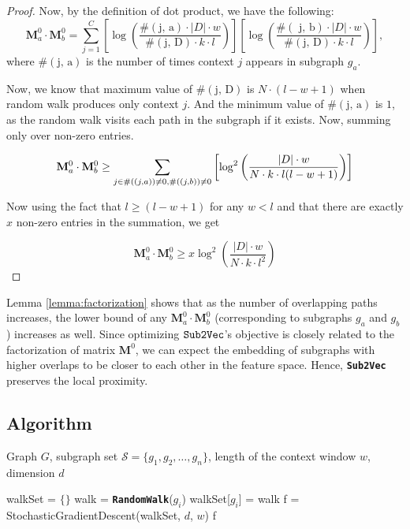 \documentclass[sigconf]{acmart}
\newcommand{\alg}{{\bf {\tt Sub2Vec}}\xspace}
\newcommand{\randomwalk}{{\bf {\tt RandomWalk}}\xspace}
\newcommand{\s}{\mathcal{S}}
\newcommand{\M}{\mathbf{M}}
\begin{document}
\begin{proof}
Now, by the definition of dot product, we have the following:
\begin{equation}
\M^{0}_{a} \cdot \M^{0}_{b} = \sum_{j=1}^C \left[ \log \left(\frac{\#(\text{j, a})\cdot |D|\cdot w} {\#(\text{j, D}) \cdot k \cdot l} \right) \right] \left[ \log \left(\frac{\#(\text{ j, b})\cdot |D|\cdot w} {\#(\text{j, D}) \cdot k \cdot l} \right) \right],
\end{equation}
where $\#(\text{j, a})$ is the number of times context $j$ appears in subgraph $g_a$.

Now, we know that maximum value of $\#(\text{j, D})$ is ${N \cdot (l - w + 1 )}$ when random walk produces only context $j$. And the minimum value of $\#(\text{j, a})$ is $1$, as the random walk visits each path in the subgraph if it exists. Now, summing only over non-zero entries.

\begin{equation}
\M^{0}_{a} \cdot \M^{0}_{b} \geq \sum_{j \in {\#(\text(j,a)) \neq 0 , \#(\text(j,b)) \neq 0}} \left[ \log^2 \left(\frac{|D|\cdot w} { N \cdot k \cdot l (l-w+1)} \right) \right]
\end{equation}

Now using the fact that $l \geq (l -w +1)$ for any $w < l$ and that there are exactly $x$ non-zero entries in the summation, we get

\begin{equation}
\M^{0}_{a} \cdot \M^{0}_{b} \geq x  \log ^2 \left(\frac{|D|\cdot w} { N \cdot k \cdot l^2} \right)
\end{equation}
\end{proof}

Lemma \ref{lemma:factorization} shows that as the number of overlapping paths increases, the lower bound of any $\M^{0}_{a} \cdot \M^{0}_{b}$ (corresponding to subgraphs $g_a$ and $g_b$) increases as well. Since optimizing $\alg$'s objective is closely related to the factorization of matrix $\M^0$, we can expect the embedding of subgraphs with higher overlaps to be closer to each other in the feature space. Hence, \alg preserves the local proximity.


\subsection{Algorithm}

\begin{algorithm}
\caption{\alg}
\label{alg:alg}
\begin{algorithmic} [1]
\REQUIRE Graph $G$, subgraph set $\s = \{g_1,g_2, \dots, g_n \}$, length of the context window $w$, dimension $d$

\STATE walkSet = $\{ \}$ 
	\STATE walk = \randomwalk($g_i$)
	\STATE walkSet[$g_i$] = walk
\ENDFOR
\STATE f = StochasticGradientDescent(walkSet, $d$, $w$) 
\RETURN f
\end{algorithmic}
\end{algorithm}
\end{document}
